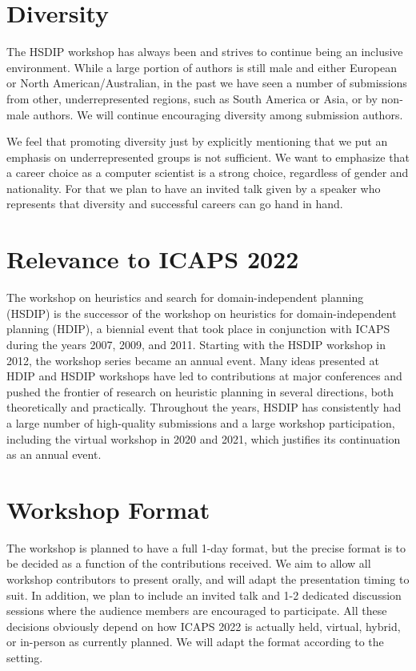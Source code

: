 \documentclass[10pt]{article}
\begin{document}
\section*{Diversity}

The HSDIP workshop has always been and strives to continue being an inclusive environment.
While a large portion of authors is still male and either European or North American/Australian, 
in the past we have seen a number of submissions from other, underrepresented regions, 
such as South America or Asia, or by non-male authors. We will continue encouraging 
diversity among submission authors.  

We feel that promoting diversity just by explicitly mentioning that we
put an emphasis on underrepresented groups is not sufficient. We
want to emphasize that a career choice as a computer scientist is a strong choice,
regardless of gender and nationality. For that we plan to have an invited talk
given by a speaker who represents that diversity and successful careers can go
hand in hand. 




\section*{Relevance to ICAPS 2022}

The workshop on heuristics and search for domain-independent planning (HSDIP) is
the successor of the workshop on heuristics for domain-independent planning
(HDIP), a biennial event that took place in conjunction with ICAPS during the
years 2007, 2009, and 2011. Starting with the HSDIP workshop in 2012, the
workshop series became an annual event.
Many ideas presented at HDIP and HSDIP workshops have led to contributions at major 
conferences and pushed the frontier of research on heuristic planning in several 
directions, both theoretically and practically. Throughout the years, HSDIP has 
consistently had a large number of high-quality submissions and a large workshop 
participation, including the virtual workshop in 2020 and 2021, which justifies its 
continuation as an annual event.

\section*{Workshop Format}

The workshop is planned to have a full 1-day format, but the precise format is
to be decided as a function of the contributions received.  We aim to allow all
workshop contributors to present orally, and will adapt the presentation timing
to suit. In addition, we plan to include an invited talk and 1-2 dedicated
discussion sessions where the audience members are encouraged to participate.
All these decisions obviously depend on how ICAPS 2022 is actually held,
virtual, hybrid, or in-person as currently planned. We will adapt the format
according to the setting.
\end{document}
